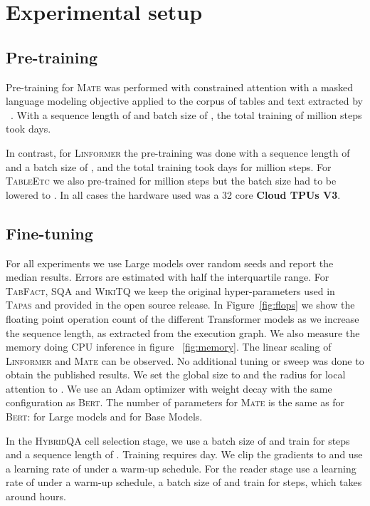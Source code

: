 \documentclass[11pt]{article}
\newcommand\sqa{\textsc{SQA}\xspace}
\newcommand\tabfact{\textsc{TabFact}\xspace}
\newcommand\wtq{\textsc{WikiTQ}\xspace}
\newcommand\hqa{\textsc{HybridQA}\xspace}
\newcommand{\tableetc}{\textsc{TableEtc}\xspace}
\newcommand{\tapas}{\textsc{Tapas}\xspace}
\newcommand{\linformer}{\textsc{Linformer}\xspace}
\newcommand{\bert}{\textsc{Bert}\xspace}
\newcommand{\model}{\textsc{Mate}\xspace}
\begin{document}
\section{Experimental setup}
\label{sec:apx-exp}

\subsection{Pre-training}

Pre-training for \model was performed with constrained attention with a masked language modeling objective applied to the corpus of tables and text extracted by ~\citet{herzig-etal-2020-tapas}. 
With a sequence length of  and batch size of , the total training of  million steps took  days.

In contrast, for \linformer the pre-training was done with a sequence length of  and a batch size of , and the total training took  days for  million steps. For \tableetc we also pre-trained for  million steps but the batch size had to be lowered to .
In all cases the hardware used was a 32 core \textbf{Cloud TPUs V3}.

\subsection{Fine-tuning}

For all experiments we use Large models over  random seeds and report the median results. Errors are estimated with half the interquartile range. For \tabfact, \sqa and \wtq we keep the original hyper-parameters used in \tapas and provided in the open source release. In Figure~\ref{fig:flops} we show the floating point operation count of the different Transformer models as we increase the sequence length, as extracted from the execution graph. We also measure the memory doing CPU inference in figure
~\ref{fig:memory}. The linear scaling of \linformer and \model can be observed. 
No additional tuning or sweep was done to obtain the published results. We set the global size  to  and the radius  for local attention to . We use an Adam optimizer with weight decay with the same configuration as \bert.
The number of parameters for \model is the same as for \bert:  for Large models and  for Base Models.

In the \hqa cell selection stage, we use a batch size of  and train for  steps and a sequence length of . Training requires  day.
We clip the gradients to  and use a learning rate of  under a  warm-up schedule.
For the reader stage use a learning rate of  under a  warm-up schedule, a batch size of  and train for  steps, which takes around  hours.
\end{document}

